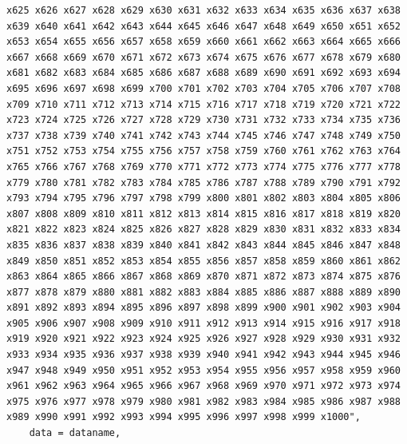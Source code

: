 \documentclass{article}
\begin{document}
\begin{lstlisting}
x625 x626 x627 x628 x629 x630 x631 x632 x633 x634 x635 x636 x637 x638 x639 x640 x641 x642 x643 x644 x645 x646 x647 x648 x649 x650 x651 x652 x653 x654 x655 x656 x657 x658 x659 x660 x661 x662 x663 x664 x665 x666 x667 x668 x669 x670 x671 x672 x673 x674 x675 x676 x677 x678 x679 x680 x681 x682 x683 x684 x685 x686 x687 x688 x689 x690 x691 x692 x693 x694 x695 x696 x697 x698 x699 x700 x701 x702 x703 x704 x705 x706 x707 x708 x709 x710 x711 x712 x713 x714 x715 x716 x717 x718 x719 x720 x721 x722 x723 x724 x725 x726 x727 x728 x729 x730 x731 x732 x733 x734 x735 x736 x737 x738 x739 x740 x741 x742 x743 x744 x745 x746 x747 x748 x749 x750 x751 x752 x753 x754 x755 x756 x757 x758 x759 x760 x761 x762 x763 x764 x765 x766 x767 x768 x769 x770 x771 x772 x773 x774 x775 x776 x777 x778 x779 x780 x781 x782 x783 x784 x785 x786 x787 x788 x789 x790 x791 x792 x793 x794 x795 x796 x797 x798 x799 x800 x801 x802 x803 x804 x805 x806 x807 x808 x809 x810 x811 x812 x813 x814 x815 x816 x817 x818 x819 x820 x821 x822 x823 x824 x825 x826 x827 x828 x829 x830 x831 x832 x833 x834 x835 x836 x837 x838 x839 x840 x841 x842 x843 x844 x845 x846 x847 x848 x849 x850 x851 x852 x853 x854 x855 x856 x857 x858 x859 x860 x861 x862 x863 x864 x865 x866 x867 x868 x869 x870 x871 x872 x873 x874 x875 x876 x877 x878 x879 x880 x881 x882 x883 x884 x885 x886 x887 x888 x889 x890 x891 x892 x893 x894 x895 x896 x897 x898 x899 x900 x901 x902 x903 x904 x905 x906 x907 x908 x909 x910 x911 x912 x913 x914 x915 x916 x917 x918 x919 x920 x921 x922 x923 x924 x925 x926 x927 x928 x929 x930 x931 x932 x933 x934 x935 x936 x937 x938 x939 x940 x941 x942 x943 x944 x945 x946 x947 x948 x949 x950 x951 x952 x953 x954 x955 x956 x957 x958 x959 x960 x961 x962 x963 x964 x965 x966 x967 x968 x969 x970 x971 x972 x973 x974 x975 x976 x977 x978 x979 x980 x981 x982 x983 x984 x985 x986 x987 x988 x989 x990 x991 x992 x993 x994 x995 x996 x997 x998 x999 x1000",
    data = dataname,

\end{lstlisting}
\end{document}
